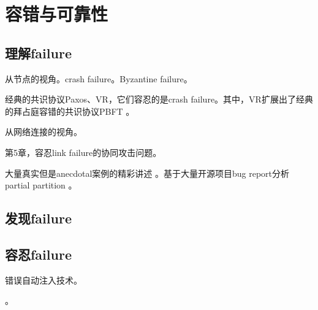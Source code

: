 \chapter{容错与可靠性}

\section{理解failure}

从节点的视角。crash failure。Byzantine failure。

\myleaf 经典的共识协议Paxos\cite{Lamport01}、VR\cite{Oki88}，它们容忍的是crash failure。其中，VR扩展出了经典的拜占庭容错的共识协议PBFT \cite{Castro02}。



从网络连接的视角。

\myleaf \cite{Lynch96-textbook}第5章，容忍link failure的协同攻击问题。

\myleaf 大量真实但是anecdotal案例的精彩讲述 \cite{Bailis14-cacm}。基于大量开源项目bug report分析partial partition \cite{Alfatafta20}。

\section{发现failure}

\section{容忍failure}

错误自动注入技术。

\myleaf \cite{Alvaro18}。